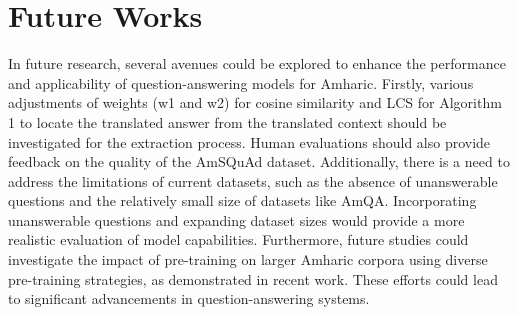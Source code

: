 \section{Future Works}
In future research, several avenues could be explored to enhance the performance and applicability of question-answering models for Amharic. Firstly, various adjustments of weights (w1 and w2) for cosine similarity and LCS for Algorithm 1 to locate the translated answer from the translated context should be investigated for the extraction process. Human evaluations should also provide feedback on the quality of the AmSQuAd dataset. Additionally, there is a need to address the limitations of current datasets, such as the absence of unanswerable questions and the relatively small size of datasets like AmQA. Incorporating unanswerable questions and expanding dataset sizes would provide a more realistic evaluation of model capabilities. Furthermore, future studies could investigate the impact of pre-training on larger Amharic corpora using diverse pre-training strategies, as demonstrated in recent work. These efforts could lead to significant advancements in question-answering systems.
